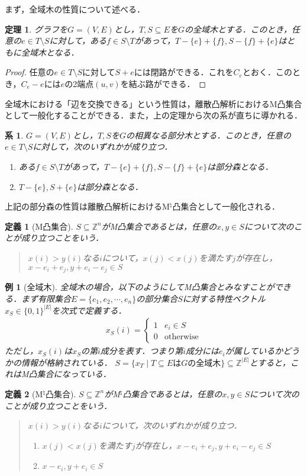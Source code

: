 \documentclass[a4paper]{jsarticle}
\newcommand{\abs}[1]{ \left| #1 \right| }
\newcommand{\Int}{\mathbb{Z}}
\theoremstyle{break}
\newtheorem{theo}{定理}[section]
\newtheorem{defi}{定義}[section]
\newtheorem{proof}{証明}[section]
\newtheorem{example}{例}[section]
\newtheorem{cor}{系}[section]
\begin{document}
まず，全域木の性質について述べる．
\begin{theo}
  グラフを$G=(V,E)$とし，$T,S\subseteq E$を$G$の全域木とする．このとき，任意の$e\in T\setminus S$に対して，ある$f\in S\setminus T$があって，$T-\{e\}+\{f\},S-\{f\}+\{e\}$はともに全域木となる．
\end{theo}
\begin{proof}
  任意の$e\in T\setminus S$に対して$S+e$には閉路ができる．これを$C_e$とおく．このとき，$C_e-e$には$e$の2端点$(u,v)$を結ぶ路ができる．
\end{proof}
全域木における「辺を交換できる」という性質は，離散凸解析におけるM凸集合として一般化することができる．また，上の定理から次の系が直ちに導かれる．
\begin{cor}
  $G=(V,E)$とし，$T,S$を$G$の相異なる部分木とする．このとき，任意の$e\in T\setminus S$に対して，次のいずれかが成り立つ．
  \begin{enumerate}
    \item ある$f\in S\setminus T$があって，$T-\{e\}+\{f\},S-\{f\}+\{e\}$は部分森となる．
    \item $T-\{e\},S+\{e\}$は部分森となる．
  \end{enumerate}
\end{cor}
上記の部分森の性質は離散凸解析におけるM${}^\natural$凸集合として一般化される．
\begin{defi}[M凸集合] 
  $S\subseteq \Int^n$がM凸集合であるとは，任意の$x,y\in S$について次のことが成り立つことをいう．
  \begin{quote}
    $x(i) > y(i)$なる$i$について，$x(j) < x(j)$を満たす$j$が存在し，$x-e_i+e_j,y+e_i-e_j\in S$
  \end{quote}
\end{defi}
\begin{example}[全域木] 
全域木の場合，以下のようにしてM凸集合とみなすことができる．まず有限集合$E = \{e_1,e_2,\cdots,e_n\}$の部分集合$S$に対する特性ベクトル$x_S\in \{0,1\}^{\abs{E}}$を次式で定義する．
\begin{align*}
  x_S(i) = \begin{cases}
    1 & e_i \in S \\
    0 & \mathrm{otherwise}
  \end{cases}
\end{align*}
ただし，$x_S(i)$は$x_S$の第$i$成分を表す．つまり第$i$成分には$e_i$が属しているかどうかの情報が格納されている．
$S = \{ x_T \mid T \subseteq E はGの全域木\} \subseteq \Int^{\abs{E}}$とすると，これはM凸集合になっている．
\end{example}
\begin{defi}[M${}^\natural$凸集合] 
  $S\subseteq \Int^n$がM${}^\natural$凸集合であるとは，任意の$x,y\in S$について次のことが成り立つことをいう．
  \begin{quote}
    $x(i) > y(i)$なる$i$について，次のいずれかが成り立つ．
    \begin{enumerate}
      \item $x(j) < x(j)$を満たす$j$が存在し，$x-e_i+e_j,y+e_i-e_j\in S$ 
      \item $x-e_i,y+e_i\in S$
    \end{enumerate}   
  \end{quote}
\end{defi}
\end{document}
